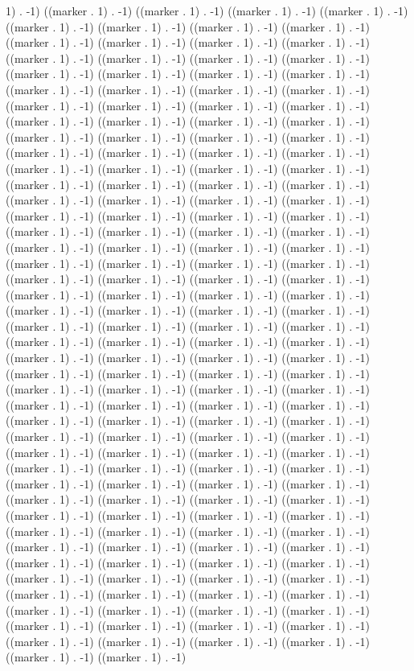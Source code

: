 1) . -1) ((marker . 1) . -1) ((marker . 1) . -1) ((marker . 1) . -1) ((marker . 1) . -1) ((marker . 1) . -1) ((marker . 1) . -1) ((marker . 1) . -1) ((marker . 1) . -1) ((marker . 1) . -1) ((marker . 1) . -1) ((marker . 1) . -1) ((marker . 1) . -1) ((marker . 1) . -1) ((marker . 1) . -1) ((marker . 1) . -1) ((marker . 1) . -1) ((marker . 1) . -1) ((marker . 1) . -1) ((marker . 1) . -1) ((marker . 1) . -1) ((marker . 1) . -1) ((marker . 1) . -1) ((marker . 1) . -1) ((marker . 1) . -1) ((marker . 1) . -1) ((marker . 1) . -1) ((marker . 1) . -1) ((marker . 1) . -1) ((marker . 1) . -1) ((marker . 1) . -1) ((marker . 1) . -1) ((marker . 1) . -1) ((marker . 1) . -1) ((marker . 1) . -1) ((marker . 1) . -1) ((marker . 1) . -1) ((marker . 1) . -1) ((marker . 1) . -1) ((marker . 1) . -1) ((marker . 1) . -1) ((marker . 1) . -1) ((marker . 1) . -1) ((marker . 1) . -1) ((marker . 1) . -1) ((marker . 1) . -1) ((marker . 1) . -1) ((marker . 1) . -1) ((marker . 1) . -1) ((marker . 1) . -1) ((marker . 1) . -1) ((marker . 1) . -1) ((marker . 1) . -1) ((marker . 1) . -1) ((marker . 1) . -1) ((marker . 1) . -1) ((marker . 1) . -1) ((marker . 1) . -1) ((marker . 1) . -1) ((marker . 1) . -1) ((marker . 1) . -1) ((marker . 1) . -1) ((marker . 1) . -1) ((marker . 1) . -1) ((marker . 1) . -1) ((marker . 1) . -1) ((marker . 1) . -1) ((marker . 1) . -1) ((marker . 1) . -1) ((marker . 1) . -1) ((marker . 1) . -1) ((marker . 1) . -1) ((marker . 1) . -1) ((marker . 1) . -1) ((marker . 1) . -1) ((marker . 1) . -1) ((marker . 1) . -1) ((marker . 1) . -1) ((marker . 1) . -1) ((marker . 1) . -1) ((marker . 1) . -1) ((marker . 1) . -1) ((marker . 1) . -1) ((marker . 1) . -1) ((marker . 1) . -1) ((marker . 1) . -1) ((marker . 1) . -1) ((marker . 1) . -1) ((marker . 1) . -1) ((marker . 1) . -1) ((marker . 1) . -1) ((marker . 1) . -1) ((marker . 1) . -1) ((marker . 1) . -1) ((marker . 1) . -1) ((marker . 1) . -1) ((marker . 1) . -1) ((marker . 1) . -1) ((marker . 1) . -1) ((marker . 1) . -1) ((marker . 1) . -1) ((marker . 1) . -1) ((marker . 1) . -1) ((marker . 1) . -1) ((marker . 1) . -1) ((marker . 1) . -1) ((marker . 1) . -1) ((marker . 1) . -1) ((marker . 1) . -1) ((marker . 1) . -1) ((marker . 1) . -1) ((marker . 1) . -1) ((marker . 1) . -1) ((marker . 1) . -1) ((marker . 1) . -1) ((marker . 1) . -1) ((marker . 1) . -1) ((marker . 1) . -1) ((marker . 1) . -1) ((marker . 1) . -1) ((marker . 1) . -1) ((marker . 1) . -1) ((marker . 1) . -1) ((marker . 1) . -1) ((marker . 1) . -1) ((marker . 1) . -1) ((marker . 1) . -1) ((marker . 1) . -1) ((marker . 1) . -1) ((marker . 1) . -1) ((marker . 1) . -1) ((marker . 1) . -1) ((marker . 1) . -1) ((marker . 1) . -1) ((marker . 1) . -1) ((marker . 1) . -1) ((marker . 1) . -1) ((marker . 1) . -1) ((marker . 1) . -1) ((marker . 1) . -1) ((marker . 1) . -1) ((marker . 1) . -1) ((marker . 1) . -1) ((marker . 1) . -1) ((marker . 1) . -1) ((marker . 1) . -1) ((marker . 1) . -1) ((marker . 1) . -1) ((marker . 1) . -1) ((marker . 1) . -1) ((marker . 1) . -1) ((marker . 1) . -1) ((marker . 1) . -1) ((marker . 1) . -1) ((marker . 1) . -1) ((marker . 1) . -1) ((marker . 1) . -1) ((marker . 1) . -1) ((marker . 1) . -1) ((marker . 1) . -1) ((marker . 1) . -1) ((marker . 1) . -1) ((marker . 1) . -1) ((marker . 1) . -1) ((marker . 1) . -1) ((marker . 1) . -1) ((marker . 1) . -1) 